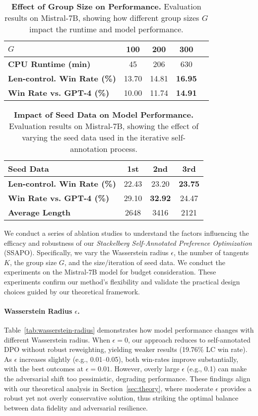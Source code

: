 \begin{table}[h]
\centering
\caption{\textbf{Effect of Group Size on Performance.} Evaluation results on Mistral-7B, showing how different group sizes $G$ impact the runtime and model performance.}
\begin{tabular}{lcccc}
\toprule
$G$ & 100 & 200 & 300 \\
\midrule
\textbf{CPU Runtime (min)} & 45 & 206 & 630 \\
\textbf{Len-control. Win Rate (\%)} & 13.70 & 14.81 & \textbf{16.95} \\
\textbf{Win Rate vs. GPT-4 (\%)} & 10.00 & 11.74 & \textbf{14.91} \\
\bottomrule
\end{tabular}
\label{tab:group-size}
\end{table}

\begin{table}[h]
\centering
\caption{\textbf{Impact of Seed Data on Model Performance.} Evaluation results on Mistral-7B, showing the effect of varying the seed data used in the iterative self-annotation process.}
\begin{tabular}{lccc}
\toprule
Seed Data & 1st & 2nd & 3rd \\
\midrule
\textbf{Len-control. Win Rate (\%)} & 22.43 & 23.20 & \textbf{23.75} \\
\textbf{Win Rate vs. GPT-4 (\%)} &  29.10 & \textbf{32.92} & 24.47 \\
\textbf{Average Length} & 2648 & 3416 & 2121 \\
\bottomrule
\end{tabular}
\label{tab:seed-data}
\end{table}

We conduct a series of ablation studies to understand the factors influencing the efficacy and robustness of our \emph{Stackelberg Self-Annotated Preference Optimization} (SSAPO). Specifically, we vary the Wasserstein radius $\epsilon$, the number of tangents $K$, the group size $G$, and the size/iteration of seed data. We conduct the experiments on the Mistral-7B model for budget consideration. These experiments confirm our method’s flexibility and validate the practical design choices guided by our theoretical framework.

\paragraph{Wasserstein Radius $\epsilon$.}
Table~\ref{tab:wasserstein-radius} demonstrates how model performance changes with different Wasserstein radius. When $\epsilon = 0$, our approach reduces to self-annotated DPO without robust reweighting, yielding weaker results (19.76\% LC win rate). 
As $\epsilon$ increases slightly (e.g., 0.01--0.05), both win-rates improve substantially, with the best outcomes at $\epsilon=0.01$. 
However, overly large $\epsilon$ (e.g., 0.1) can make the adversarial shift too pessimistic, degrading performance. 
These findings align with our theoretical analysis in Section~\ref{sec:theory}, where moderate $\epsilon$ provides a robust yet not overly conservative solution, thus striking the optimal balance between data fidelity and adversarial resilience.


